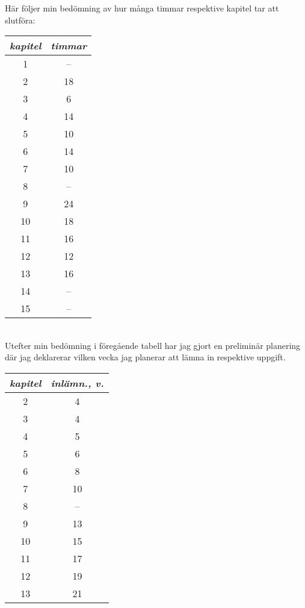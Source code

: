 \documentclass[a4paper,10pt]{article}
\begin{document}
Här följer min bedömning av hur många timmar respektive kapitel tar att slutföra:
\\

\begin{tabular}{|cc|} \hline
 \emph{kapitel} & \emph{timmar} \\ \hline \hline
 1 & -- 	\\	\hline
 2 & 18 	\\	\hline
 3 & 6 		\\	\hline
 4 & 14 	\\	\hline
 5 & 10		\\	\hline
 6 & 14		\\	\hline
 7 & 10		\\	\hline
 8 & --		\\	\hline
 9 & 24		\\	\hline
 10 & 18 	\\	\hline
 11 & 16 	\\	\hline
 12 & 12 	\\	\hline
 13 & 16 	\\	\hline
 14 & -- 	\\	\hline
 15 & -- 	\\	\hline
\end{tabular}
\\

Utefter min bedömning i föregående tabell har jag gjort en preliminär planering där jag deklarerar vilken vecka jag planerar att lämna in respektive uppgift.
\\

\begin{tabular}{|cc|} \hline
 \emph{kapitel} & \emph{inlämn., v.} \\ \hline \hline
 2 & 4		\\ 	\hline
 3 & 4		\\ 	\hline
 4 & 5		\\ 	\hline
 5 & 6		\\ 	\hline
 6 & 8		\\ 	\hline
 7 & 10		\\ 	\hline
 8 & --		\\ 	\hline
 9 & 13		\\ 	\hline
 10 & 15	\\ 	\hline
 11 & 17	\\ 	\hline
 12 & 19	\\ 	\hline
 13 & 21	\\ 	\hline
\end{tabular}
\end{document}
